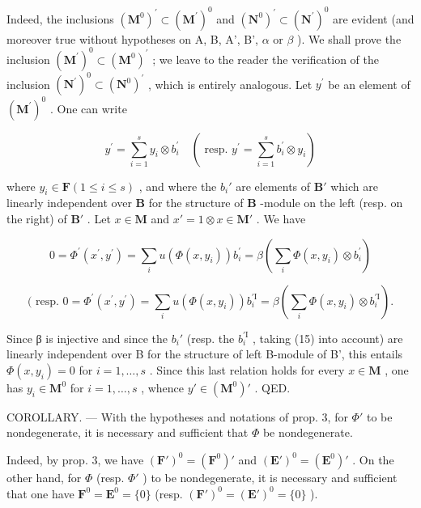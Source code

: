 Indeed, the inclusions \((\mathbf{M}^{0})^{\prime}\subset(\mathbf{M}^{\prime})^{0}\) and \((\mathbf{N}^{0})^{\prime}\subset(\mathbf{N}^{\prime})^{0}\) are evident (and moreover true without hypotheses on A, B, A', B', \(\alpha\) or \(\beta\) ). We shall prove the inclusion \((\mathbf{M}^{\prime})^{0}\subset(\mathbf{M}^{0})^{\prime}\) ; we leave to the reader the verification of the inclusion \((\mathbf{N}^{\prime})^{0}\subset(\mathbf{N}^{0})^{\prime}\) , which is entirely analogous. Let \(y^{\prime}\) be an element of \((\mathbf{M}^{\prime})^{0}\) . One can write

\[
y ^ {\prime} = \sum_ {i = 1} ^ {s} y _ {i} \otimes b _ {i} ^ {\prime} \quad (\text { resp. } y ^ {\prime} = \sum_ {i = 1} ^ {s} b _ {i} ^ {\prime} \otimes y _ {i})
\]

where \(y_i \in \mathbf{F} (1 \leqslant i \leqslant s)\) , and where the \(b_i'\) are elements of \(\mathbf{B}'\) which are linearly independent over \(\mathbf{B}\) for the structure of \(\mathbf{B}\) -module on the left (resp. on the right) of \(\mathbf{B}'\) . Let \(x \in \mathbf{M}\) and \(x' = 1 \otimes x \in \mathbf{M}'\) . We have

\[
0 = \Phi^ {\prime} (x ^ {\prime}, y ^ {\prime}) = \sum_ {i} u (\Phi (x, y _ {i})) b _ {i} ^ {\prime} = \beta (\sum_ {i} \Phi (x, y _ {i}) \otimes b _ {i} ^ {\prime})
\]

\[
(\text { resp. } 0 = \Phi^ {\prime} (x ^ {\prime}, y ^ {\prime}) = \sum_ {i} u (\Phi (x, y _ {i})) b _ {i} ^ {\prime \mathrm{I}} = \beta (\sum_ {i} \Phi (x, y _ {i}) \otimes b _ {i} ^ {\prime \mathrm{I}}).
\]

Since β is injective and since the \(b_i'\) (resp. the \(b _ {i} ^ {\prime \mathrm{I}}\) , taking (15) into account) are linearly independent over B for the structure of left B-module of B', this entails \(\Phi(x, y_i) = 0\) for \(i = 1, \ldots, s\) . Since this last relation holds for every \(x \in \mathbf{M}\) , one has \(y_i \in \mathbf{M}^0\) for \(i = 1, \ldots, s\) , whence \(y' \in (\mathbf{M}^0)'\) . QED.

COROLLARY. --- With the hypotheses and notations of prop. 3, for \(\Phi'\) to be nondegenerate, it is necessary and sufficient that \(\Phi\) be nondegenerate.

Indeed, by prop. 3, we have \((\mathbf{F}')^0 = (\mathbf{F}^0)'\) and \((\mathbf{E}')^0 = (\mathbf{E}^0)'\) . On the other hand, for \(\Phi\) (resp. \(\Phi'\) ) to be nondegenerate, it is necessary and sufficient that one have \(\mathbf{F}^0 = \mathbf{E}^0 = \{0\}\) (resp. \((\mathbf{F}')^0 = (\mathbf{E}')^0 = \{0\}\) ).

